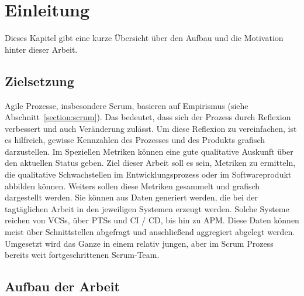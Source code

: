 \chapter{Einleitung}

Dieses Kapitel gibt eine kurze Übersicht über den Aufbau und die Motivation hinter dieser Arbeit.

\section{Zielsetzung}

Agile Prozesse, insbesondere Scrum, basieren auf Empirismus (siehe Abschnitt~\ref{section:scrum}).
Das bedeutet, dass sich der Prozess durch Reflexion verbessert und auch Veränderung zulässt.
Um diese Reflexion zu vereinfachen, ist es hilfreich, gewisse Kennzahlen des Prozesses und des Produkts grafisch darzustellen.
Im Speziellen Metriken können eine gute qualitative Auskunft über den aktuellen Status geben.
Ziel dieser Arbeit soll es sein, Metriken zu ermitteln, die qualitative Schwachstellen im Entwicklungsprozess oder im Softwareprodukt abbilden können.
Weiters sollen diese Metriken gesammelt und grafisch dargestellt werden.
Sie können aus Daten generiert werden, die bei der tagtäglichen Arbeit in den jeweiligen Systemen erzeugt werden.
Solche Systeme reichen von \acfp{VCS}, über \acfp{PTS} und \acf{CI} / \acf{CD}, bis hin zu \acf{APM}.
Diese Daten können meist über Schnittstellen abgefragt und anschließend aggregiert abgelegt werden.
Umgesetzt wird das Ganze in einem relativ jungen, aber im Scrum Prozess bereits weit fortgeschrittenen Scrum-Team.

\clearpage
\section{Aufbau der Arbeit}

